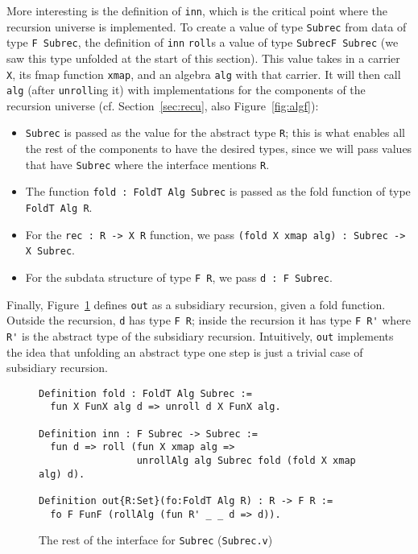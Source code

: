 \documentclass[a4paper,USenglish]{lipics-v2021}
\begin{document}
More interesting is the definition of \verb|inn|, which is the
critical point where the recursion universe is implemented.  To create
a value of type \verb|Subrec| from data of type \verb|F Subrec|, the
definition of \verb|inn| \verb|roll|s a value of type
\verb|SubrecF Subrec| (we saw this type unfolded at the start of
this section).  This value takes in a carrier
\verb|X|, its fmap function \verb|xmap|, and an algebra \verb|alg|
with that carrier.  It will then call \verb|alg| (after \verb|unroll|ing
it) with implementations for the components of the recursion universe
(cf. Section~\ref{sec:recu}, also Figure~\ref{fig:algf}):
\begin{itemize}
\item \verb|Subrec| is passed as the value for the abstract type \verb|R|; this is what enables all
  the rest of the components to have the desired types, since we will pass values that have \verb|Subrec|
  where the interface mentions \verb|R|.
\item The function \verb|fold : FoldT Alg Subrec| is passed as
  the fold function of type \verb|FoldT Alg R|. 
\item For the \verb|rec : R -> X R| function, we pass \verb|(fold X xmap alg) : Subrec -> X Subrec|.
\item For the subdata structure of type \verb|F R|, we pass \verb|d : F Subrec|. 
\end{itemize}

Finally, Figure~\ref{fig:subrecb} defines \verb|out| as a subsidiary
recursion, given a fold function.
Outside the recursion, \verb|d| has type \verb|F R|; inside the
recursion it has type \verb|F R'| where \verb|R'| is the abstract type
of the subsidiary recursion.  Intuitively, \verb|out| implements the idea that
unfolding an abstract type one step is just a trivial case of
subsidiary recursion.

\begin{figure}
\begin{verbatim}
Definition fold : FoldT Alg Subrec := 
  fun X FunX alg d => unroll d X FunX alg.

Definition inn : F Subrec -> Subrec :=
  fun d => roll (fun X xmap alg =>
                 unrollAlg alg Subrec fold (fold X xmap alg) d).

Definition out{R:Set}(fo:FoldT Alg R) : R -> F R :=
  fo F FunF (rollAlg (fun R' _ _ d => d)).
\end{verbatim}
\caption{The rest of the interface for \texttt{Subrec} (\texttt{Subrec.v})}
\label{fig:subrecb}
\end{figure}
\end{document}
